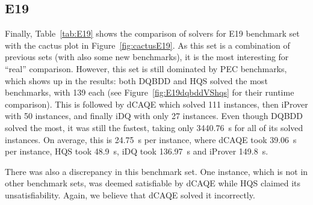 \documentclass[
  digital, %
  color,
  twoside, %
  table,   %
  nolof,     %
  nolot,     %
]{fithesis3}
\theoremstyle{definition}
\theoremstyle{remark}
\begin{document}
\subsection{E19}
Finally, Table~\ref{tab:E19} shows the comparison of solvers for E19 benchmark set with the cactus plot in Figure~\ref{fig:cactusE19}. As this set is a combination of previous sets (with also some new benchmarks), it is the most interesting for ``real'' comparison. However, this set is still dominated by PEC benchmarks, which shows up in the results: both DQBDD and HQS solved the most benchmarks, with 139 each (see Figure~\ref{fig:E19dqbddVShqs} for their runtime comparison). This is followed by dCAQE which solved 111 instances, then iProver with 50 instances, and finally iDQ with only 27 instances. Even though DQBDD solved the most, it was still the fastest, taking only \SI{3440.76}{s} for all of its solved instances. On average, this is \SI{24.75}{s} per instance, where dCAQE took \SI{39.06}{s} per instance, HQS took \SI{48.9}{s}, iDQ took \SI{136.97}{s} and iProver \SI{149.8}{s}.

There was also a discrepancy in this benchmark set. One instance, which is not in other benchmark sets, was deemed satisfiable by dCAQE while HQS claimed its unsatisfiability. Again, we believe that dCAQE solved it incorrectly.
\end{document}
